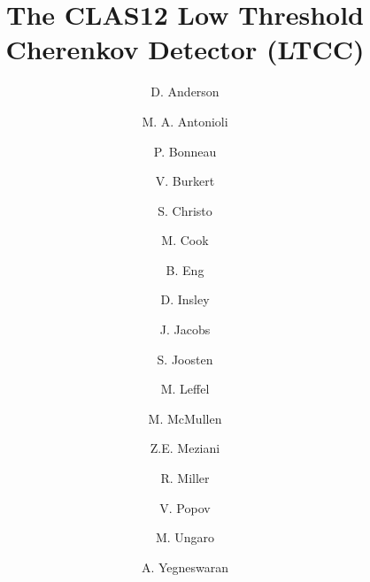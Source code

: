 \title{The CLAS12 Low Threshold Cherenkov Detector (LTCC)}


\author[A]{D. Anderson}     %
\author[A]{M. A. Antonioli} %
\author[A]{P. Bonneau}      %
\author[A]{V. Burkert}      %
\author[A]{S. Christo}      %
\author[A]{M. Cook}         %
\author[A]{B. Eng}          %
\author[A]{D. Insley}       %
\author[A]{J. Jacobs}       %
\author[B]{S. Joosten}      %
\author[A]{M. Leffel}       %
\author[A]{M. McMullen}     %
\author[B]{Z.E. Meziani}    %
\author[A]{R. Miller}       %
\author[A]{V. Popov}        %
\author[A]{M. Ungaro}       %
\author[A]{A. Yegneswaran}  %


\address[A]{Thomas Jefferson National Accelerator Facility, Newport News, VA, USA}
\address[B]{Temple University, Philadelphia, PA, USA}
